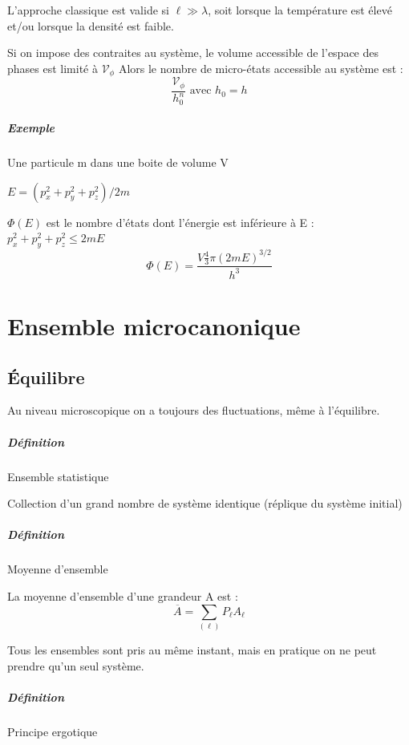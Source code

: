 \documentclass[12pt,a4paper]{report}
\begin{document}
L'approche classique est valide si \(\ell \gg \lambda\), soit lorsque la température est élevé et/ou lorsque la densité est faible.

Si on impose des contraites au système, le volume accessible de l'espace des phases est limité à \(\mathscr{V}_\phi\)
Alors le nombre de micro-états accessible au système est :
\[
	\dfrac{\mathscr{V}_\phi}{h_0^n} \text{ avec } h_0 = h
\]

\paragraph{Exemple} Une particule m dans une boite de volume V


\(E = \left( p_x^2 + p_y^2 + p_z^2\right)/2m\)

\(\Phi(E)\) est le nombre d'états dont l'énergie est inférieure à E :\\
\(p_x^2 + p_y^2 + p_z^2 \leq 2mE\)
\[
	\Phi(E) = \dfrac{V \frac{4}{3} \pi (2mE)^{3/2}}{h^3}
\]

\chapter{Ensemble microcanonique}

\section{Équilibre}

Au niveau microscopique on a toujours des fluctuations, même à l'équilibre.

\paragraph{Définition} Ensemble statistique

Collection d'un grand nombre de système identique (réplique du système initial)

\paragraph{Définition} Moyenne d'ensemble

La moyenne d'ensemble d'une grandeur A est :
\[
	\overline{A} = \sum_{(\ell)} P_\ell A_\ell
\]

Tous les ensembles sont pris au même instant, mais en pratique on ne peut prendre qu'un seul système.

\paragraph{Définition} Principe ergotique
\end{document}

